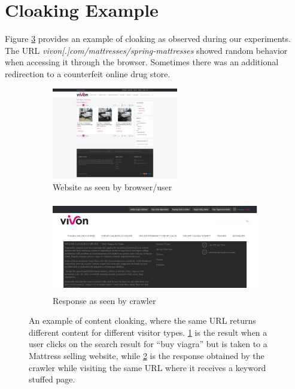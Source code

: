 \documentclass[letterpaper,twocolumn,10pt]{article}
\begin{document}
\appendixpage
\appendix
\section{Cloaking Example}
Figure \ref{fig:cloak_eg} provides an example of cloaking as observed during our experiments. The URL {\it vivon[.]com/mattresses/spring-mattresses} showed random behavior when accessing it through the browser. Sometimes there was an additional redirection to a counterfeit online drug store.
\begin{figure}[t]
  \begin{subfigure}{0.5\textwidth}
    \includegraphics[width=\textwidth, height=4cm]{./proj-org.png}
    \caption{Website as seen by browser/user}
    \label{fig:org}
  \end{subfigure}
  \begin{subfigure}{0.5\textwidth}
    \includegraphics[width=\textwidth,height=4cm]{./proj-cloak.png}
    \caption{Response as seen by crawler}
    \label{fig:cloak}
  \end{subfigure}
	\caption{An example of content cloaking, where the same URL returns different content for different visitor types. \ref{fig:org} is the result when a user clicks on the search result for ``buy viagra'' but is taken to a Mattress selling website, while \ref{fig:cloak} is the response obtained by the crawler while visiting the same URL where it receives a keyword stuffed page.}
    \label{fig:cloak_eg}
\end{figure}
\end{document}
